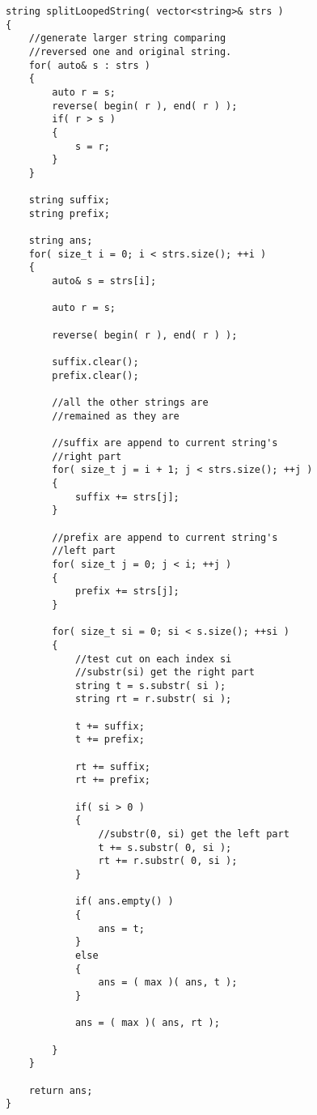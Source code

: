 \setcounter{lstlisting}{0}
\begin{lstlisting}[style=customc, caption={Test Cuts}]
string splitLoopedString( vector<string>& strs )
{
    //generate larger string comparing
    //reversed one and original string.
    for( auto& s : strs )
    {
        auto r = s;
        reverse( begin( r ), end( r ) );
        if( r > s )
        {
            s = r;
        }
    }

    string suffix;
    string prefix;

    string ans;
    for( size_t i = 0; i < strs.size(); ++i )
    {
        auto& s = strs[i];

        auto r = s;

        reverse( begin( r ), end( r ) );

        suffix.clear();
        prefix.clear();

        //all the other strings are
        //remained as they are

        //suffix are append to current string's
        //right part
        for( size_t j = i + 1; j < strs.size(); ++j )
        {
            suffix += strs[j];
        }

        //prefix are append to current string's
        //left part
        for( size_t j = 0; j < i; ++j )
        {
            prefix += strs[j];
        }

        for( size_t si = 0; si < s.size(); ++si )
        {
            //test cut on each index si
            //substr(si) get the right part
            string t = s.substr( si );
            string rt = r.substr( si );

            t += suffix;
            t += prefix;

            rt += suffix;
            rt += prefix;

            if( si > 0 )
            {
                //substr(0, si) get the left part
                t += s.substr( 0, si );
                rt += r.substr( 0, si );
            }

            if( ans.empty() )
            {
                ans = t;
            }
            else
            {
                ans = ( max )( ans, t );
            }

            ans = ( max )( ans, rt );

        }
    }

    return ans;
}
\end{lstlisting}
